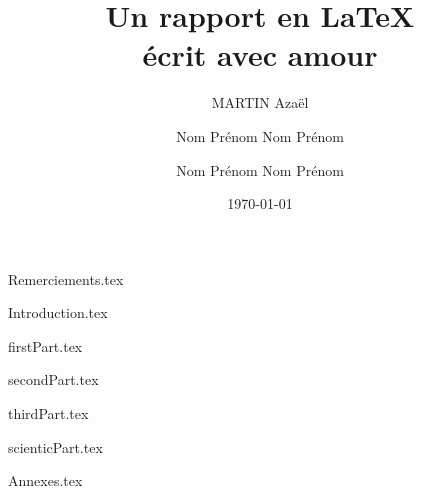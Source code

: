 \documentclass{rUTT}
\title{Un rapport en \LaTeX \\ écrit avec amour}
\date{\today}
\author{{\sc MARTIN} Azaël
\and
{\sc Nom} Prénom
\break
{\sc Nom} Prénom
\and
{\sc Nom} Prénom
\break
{\sc Nom} Prénom
}
\begin{document}

    \frontpagereports %

    \myemptypage %

    \justifying

    {Remerciements.tex} %

    \clearpage




    \clearpage


    {Introduction.tex}

    \clearpage

    {firstPart.tex}

    \clearpage

    {secondPart.tex}

    \clearpage

    {thirdPart.tex}

    \clearpage

    {scienticPart.tex}

    \clearpage

    \tripleS

    {Annexes.tex}

    \clearpage


    {
    \raggedright %
    \sloppy
    \nocite{*} %
    \printbibliography[title={Bibliographie},heading=bibintoc]

    \clearpage

    \listoffigures
    \listoftables
    }

    \clearpage
    \thispagestyle{empty}
    \setcounter{tocdepth}{10} %
    \tableofcontents

    \clearpage
    \myemptypage
\end{document}
